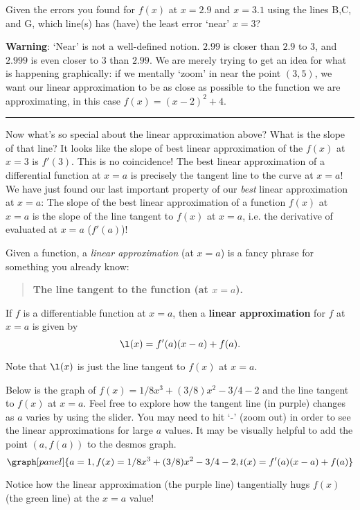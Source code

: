 \documentclass[handout,nooutcomes]{ximera}
\begin{document}
\begin{question}
Given the errors you found for $f(x)$ at $x=2.9$ and $x=3.1$ using the lines B,C, and G, which line(s) has (have) the least error `near' $x=3$?
\begin{selectAll}
\end{selectAll}
\end{question}

\textbf{Warning}: `Near' is not a well-defined notion. $2.99$ is closer than $2.9$
to $3$, and
$2.999$ is even closer to $3$ than $2.99$. We are merely trying to get 
an idea for what is happening graphically: if we mentally `zoom' in 
near the point $(3,5)$, we want our linear approximation to
be as close as possible to the function we are approximating, in this case $f(x) = (x-2)^2 + 4$.\\
\hrule
\medskip

Now what's so special about the linear approximation above? 
What is the slope of that line? It looks like the slope of best linear
approximation of the $f(x)$ at $x=3$ is $f'(3)$. This is no coincidence! 
The best linear approximation of a differential function at $x=a$
is precisely the tangent line to the curve at $x=a$! We have just found our last important property of our \textit{best} linear approximation at $x=a$: The slope of the best linear approximation of a function $f(x)$ at $x=a$ is the slope of the line tangent to $f(x)$ at $x=a$, i.e. the derivative of evaluated at $x=a$ ($f'(a)$)!\\
\medskip


Given a function, a \textit{linear approximation} (at $x=a$) is a fancy phrase
for something you already know:
\begin{center}
\begin{quote}
  \textbf{The line tangent to the function (at $x=a$).}
\end{quote}
\end{center}


\begin{definition}
If $f$ is a differentiable function at $x=a$, then a \textbf{linear
  approximation} for $f$ at $x=a$ is given by
\[
\l(x) = f'(a)(x-a) +f(a).\\
\]
\end{definition}






Note that $\l(x)$ is just the line tangent to $f(x)$ at $x=a$.


\begin{example}
Below is the graph of $f(x) = 1/8x^3 + (3/8)x^2 -3/4 - 2$ and the line
tangent to $f(x)$ at $x=a$. Feel free to explore how the tangent line
(in purple) changes as $a$ varies by using the slider. You may need to
hit `-' (zoom out) in order to see the linear approximations for large $a$ values. 
It may be visually helpful to add the point $(a,f(a))$ to the desmos graph.
\[
\graph[panel]{a=1, f(x) = 1/8x^3 + (3/8)x^2 -3/4 - 2, t(x) = f'(a)(x-a)+ f(a)}
\]

Notice how the linear approximation (the purple line) tangentially hugs
$f(x)$ (the green line) at the $x=a$ value!
\end{example}
\end{document}
